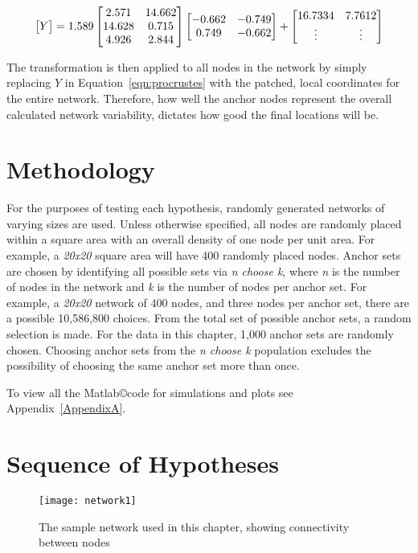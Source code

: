 \begin{equation}\label{eqn:sampleProcrustes1}
\begin{bmatrix}$$Y$$\end{bmatrix}=1.589\begin{bmatrix}
	2.571   & 14.662 \\
   14.628   &  0.715 \\
    4.926   &  2.844\end{bmatrix}\begin{bmatrix}
	-0.662  & -0.749 \\
    0.749   & -0.662\end{bmatrix}+\begin{bmatrix}
16.7334 & 7.7612 \\
\vdots & \vdots$$\end{bmatrix}
\end{equation}

The transformation is then applied to all nodes in the network by simply replacing $Y$ in Equation~\ref{eqn:procrustes} with the patched, local coordinates for the entire network. Therefore, how well the anchor nodes represent the overall calculated network variability, dictates how good the final locations will be.

\section{Methodology}
For the purposes of testing each hypothesis, randomly generated networks of varying sizes are used.  Unless otherwise specified, all nodes are randomly placed within a square area with an overall density of one node per unit area.  For example, a \emph{20x20} square area will have 400 randomly placed nodes.  Anchor sets are chosen by identifying all possible sets via \emph{n choose k}, where \emph{n} is the number of nodes in the network and \emph{k} is the number of nodes per anchor set.  For example, a \emph{20x20} network of 400 nodes, and three nodes per anchor set, there are a possible 10,586,800 choices.  From the total set of possible anchor sets, a random selection is made.  For the data in this chapter, 1,000 anchor sets are randomly chosen.  Choosing anchor sets from the \emph{n choose k} population excludes the possibility of choosing the same anchor set more than once.

To view all the Matlab\copyright code for simulations and plots see Appendix~\ref{AppendixA}.

\section{Sequence of Hypotheses}
\begin{figure}
	\centering
		\texttt{[image: network1]}
	\caption[The sample network used in this chapter]{The sample network used in this chapter, showing connectivity between nodes}
	\label{fig:HypothesesNetwork}
\end{figure}

